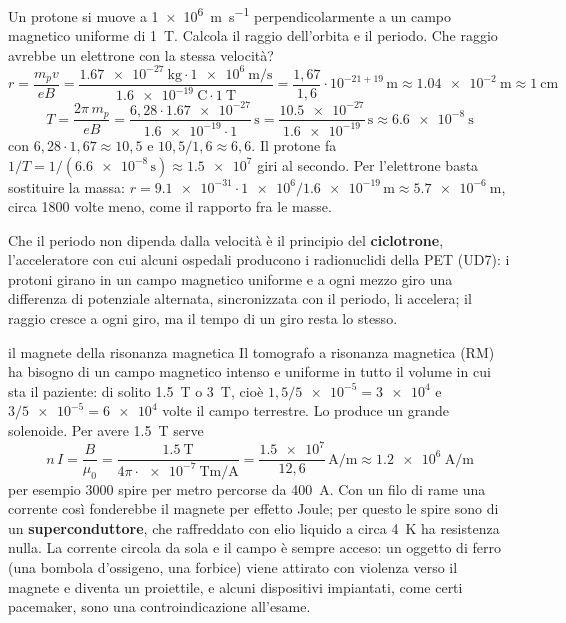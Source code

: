 \begin{esempio}
Un protone si muove a \SI{1e6}{\metre\per\second} perpendicolarmente a un campo magnetico uniforme di \SI{1}{\tesla}. Calcola il raggio dell'orbita e il periodo. Che raggio avrebbe un elettrone con la stessa velocità?
\[
  r = \frac{m_p v}{eB} = \frac{\SI{1,67e-27}{\kilo\gram} \cdot \SI{1e6}{\metre\per\second}}{\SI{1,6e-19}{\coulomb} \cdot \SI{1}{\tesla}} = \frac{1{,}67}{1{,}6} \cdot 10^{-21+19}\,\si{\metre} \approx \SI{1,04e-2}{\metre} \approx \SI{1}{\centi\metre}
\]
\[
  T = \frac{2\pi\,m_p}{eB} = \frac{6{,}28 \cdot \num{1,67e-27}}{\num{1,6e-19} \cdot 1}\,\si{\second} = \frac{\num{10,5e-27}}{\num{1,6e-19}}\,\si{\second} \approx \SI{6,6e-8}{\second}
\]
con $6{,}28 \cdot 1{,}67 \approx 10{,}5$ e $10{,}5/1{,}6 \approx 6{,}6$. Il protone fa $1/T = 1/(\num{6,6e-8}\,\si{\second}) \approx \num{1,5e7}$ giri al secondo. Per l'elettrone basta sostituire la massa: $r = \num{9,1e-31} \cdot \num{1e6}/\num{1,6e-19}\,\si{\metre} \approx \SI{5,7e-6}{\metre}$, circa 1800 volte meno, come il rapporto fra le masse.
\end{esempio}



Che il periodo non dipenda dalla velocità è il principio del \textbf{ciclotrone}, l'acceleratore con cui alcuni ospedali producono i radionuclidi della PET (UD7): i protoni girano in un campo magnetico uniforme e a ogni mezzo giro una differenza di potenziale alternata, sincronizzata con il periodo, li accelera; il raggio cresce a ogni giro, ma il tempo di un giro resta lo stesso.

\begin{applicazione}{il magnete della risonanza magnetica}
Il tomografo a risonanza magnetica (RM) ha bisogno di un campo magnetico intenso e uniforme in tutto il volume in cui sta il paziente: di solito \SI{1,5}{\tesla} o \SI{3}{\tesla}, cioè $1{,}5/\num{5e-5} = \num{3e4}$ e $3/\num{5e-5} = \num{6e4}$ volte il campo terrestre. Lo produce un grande solenoide. Per avere \SI{1,5}{\tesla} serve
\[
  n\,I = \frac{B}{\mu_0} = \frac{\SI{1,5}{\tesla}}{4\pi \cdot \SI{e-7}{\tesla\metre\per\ampere}} = \frac{\num{1,5e7}}{12{,}6}\,\si{\ampere\per\metre} \approx \SI{1,2e6}{\ampere\per\metre}
\]
per esempio 3000 spire per metro percorse da \SI{400}{\ampere}. Con un filo di rame una corrente così fonderebbe il magnete per effetto Joule; per questo le spire sono di un \textbf{superconduttore}, che raffreddato con elio liquido a circa \SI{4}{\kelvin} ha resistenza nulla. La corrente circola da sola e il campo è sempre acceso: un oggetto di ferro (una bombola d'ossigeno, una forbice) viene attirato con violenza verso il magnete e diventa un proiettile, e alcuni dispositivi impiantati, come certi pacemaker, sono una controindicazione all'esame.
\end{applicazione}

